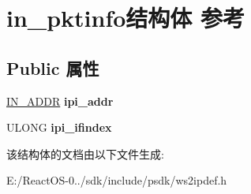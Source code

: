 \hypertarget{structin__pktinfo}{}\section{in\+\_\+pktinfo结构体 参考}
\label{structin__pktinfo}
\subsection*{Public 属性}
\begin{DoxyCompactItemize}
\item 
\mbox{\label{structin__pktinfo_aec2d559da5feba70f1150c1a27d8bdb1}} 
\hyperlink{structin__addr}{I\+N\+\_\+\+A\+D\+DR} {\bfseries ipi\+\_\+addr}
\item 
\mbox{\label{structin__pktinfo_a0201f0d7469728ac912c64cc34a07138}} 
U\+L\+O\+NG {\bfseries ipi\+\_\+ifindex}
\end{DoxyCompactItemize}


该结构体的文档由以下文件生成\+:\begin{DoxyCompactItemize}
\item 
E\+:/\+React\+O\+S-\/0../sdk/include/psdk/ws2ipdef.\+h\end{DoxyCompactItemize}
